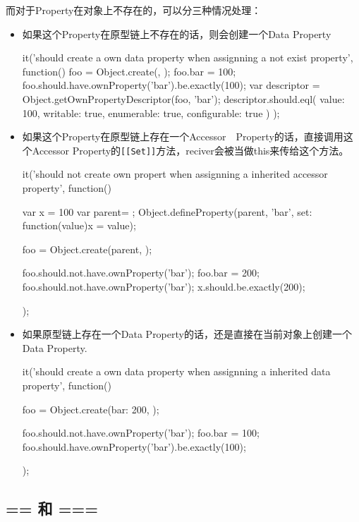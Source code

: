 而对于Property在对象上不存在的，可以分三种情况处理：
\begin{itemize}
\item 如果这个Property在原型链上不存在的话，则会创建一个Data Property
\begin{JavaScript}[Property在原型链上也不存在的话]
		it('should create a own data property when assignning a not exist property', function() {
			foo = Object.create({}, {});
			foo.bar = 100;
			foo.should.have.ownProperty('bar').be.exactly(100);
			var descriptor = Object.getOwnPropertyDescriptor(foo, 'bar');
			descriptor.should.eql({
				value: 100,
				writable: true,
				enumerable: true,
				configurable: true
			})
		});
\end{JavaScript}
\item 如果这个Property在原型链上存在一个Accessor　Property的话，直接调用这个Accessor Property的\lstinline![[Set]]!方法，reciver会被当做this来传给这个方法。
\begin{JavaScript}
		it('should not create own propert when assignning a inherited accessor property', function(){
			var x = 100
			var parent= {};
			Object.defineProperty(parent, 'bar', {set: function(value){x = value}});

			foo = Object.create(parent, {});

			foo.should.not.have.ownProperty('bar');
			foo.bar = 200;
			foo.should.not.have.ownProperty('bar');
			x.should.be.exactly(200);
		});
\end{JavaScript}

\item 如果原型链上存在一个Data Property的话，还是直接在当前对象上创建一个Data Property.
\begin{JavaScript}
		it('should create a own data property when assignning a inherited data property', function(){
			foo = Object.create({bar: 200}, {});

			foo.should.not.have.ownProperty('bar');
			foo.bar = 100;
			foo.should.have.ownProperty('bar').be.exactly(100);
		});
\end{JavaScript}
\end{itemize}
	
\subsection{== 和 ===}

